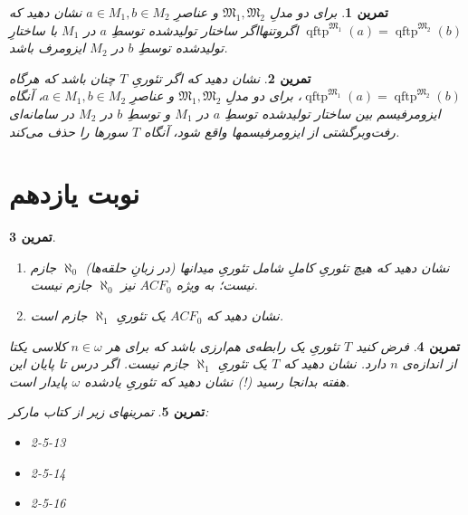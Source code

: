 \documentclass[12pt,a4paper]{report}
\theoremstyle{colorhead}
\newtheorem{tam}{تمرین}
\DeclareMathOperator{\qftp}{qftp}
\begin{document}
\begin{tam}
برای دو مدلِ
$\mathfrak{M}_1,\mathfrak{M}_2$
و عناصرِ
$a\in M_1,b\in M_2$
نشان دهید که 
\mbox{$\qftp^{\mathfrak{M}_1}(a)=\qftp^{\mathfrak{M}_2}(b)$}
اگروتنهااگر ساختار
تولیدشده توسطِ
$a$
در
$M_1$
با ساختارِ تولیدشده توسطِ
$b$
در
$M_2$
ایزومرف باشد. 
\end{tam}
\begin{tam}
نشان دهید که اگر  تئوریِ 
$T$
چنان باشد که
هرگاه
$\qftp^{\mathfrak{M}_1}(a)=\qftp^{\mathfrak{M}_2}(b)$،
برای دو مدلِ
$\mathfrak{M}_1,\mathfrak{M}_2$
و عناصرِ
$a\in M_1,b\in M_2$، 
آنگاه ایزومرفیسم بین ساختار تولیدشده توسطِ
$a$
در
$M_1$
و توسطِ
$b$
در
$M_2$
در سامانه‌ای رفت‌وبرگشتی از ایزومرفیسمها واقع شود، آنگاه
$T$
سورها را حذف می‌کند.
\end{tam}
\section{نوبت یازدهم}
\begin{tam}
\hfill 
\begin{enumerate}
\item 
نشان دهید که هیچ تئوریِ کاملِ
شامل تئوریِ میدانها 
	(در زبانِ حلقه‌ها)
	$\aleph_0$
	جازم نیست؛ به ویژه
	$ACF_0$
	نیز 
	$\aleph_0$
	جازم نیست.
	\item
	نشان دهید که
	$ACF_0$
	یک تئوریِ
	$\aleph_1$
	جازم است.
	\end{enumerate}
\end{tam}
\begin{tam}
فرض کنید 
$T$
تئوریِ یک رابطه‌ی هم‌ارزی باشد که برای هر
$n\in \omega$
کلاسی یکتا از اندازه‌ی
$n$
دارد. نشان دهید که 
$T$
یک تئوریِ
$\aleph_1$
جازم نیست.	اگر درس تا پایان این هفته بدانجا رسید (!)‌
نشان دهید که تئوریِ یادشده
$\omega$
پایدار است.
\end{tam}
\begin{tam}
تمرینهای زیر از کتاب مارکر:
\begin{itemize}
\item 2-5-13
\item 2-5-14
\item 2-5-16
\end{itemize}
\end{tam}
\end{document}
